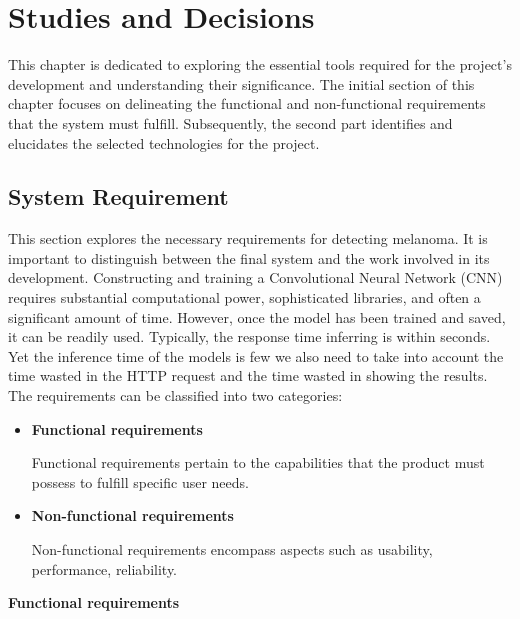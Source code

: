 \chapter{Studies and Decisions}
\label{cap:studies_and_decisions}

This chapter is dedicated to exploring the essential tools required for the project's development and understanding their significance. The initial section of this chapter focuses on delineating the functional and non-functional requirements that the system must fulfill. Subsequently, the second part identifies and elucidates the selected technologies for the project.

\section{System Requirement}

This section explores the necessary requirements for detecting melanoma. It is important to distinguish between the final system and the work involved in its development. Constructing and training a Convolutional Neural Network (CNN) requires substantial computational power, sophisticated libraries, and often a significant amount of time. However, once the model has been trained and saved, it can be readily used. Typically, the response time inferring is within seconds. Yet the inference time of the models is few we also need to take into account the time wasted in the HTTP request and the time wasted in showing the results. \\

The requirements can be classified into two categories: 

\begin{itemize}
    \item \textbf{Functional requirements}
    
    Functional requirements pertain to the capabilities that the product must possess to fulfill specific user needs.

    \item \textbf{Non-functional requirements}

    Non-functional requirements encompass aspects such as usability, performance, reliability.
\end{itemize}

\newpage

\vspace{0.5cm}
\textbf{Functional requirements} \\

